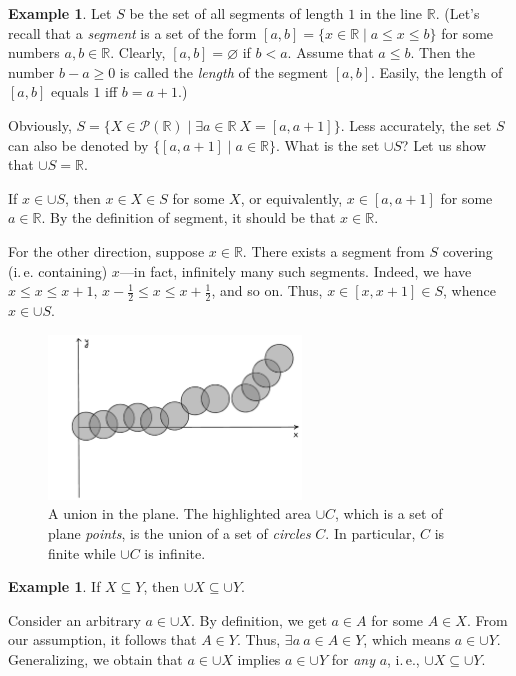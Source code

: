 \documentclass[12pt,notitlepage]{article}
\theoremstyle{plain}
\theoremstyle{definition}
\newtheorem{exm}[thm]{Example}
\theoremstyle{plain}
\newcommand{\R}{\mathbb{R}}
\newcommand{\sbs}{\subseteq}
\newcommand{\void}{\varnothing}
\newcommand{\mP}{\mathcal{P}}
\newcommand{\1}{\mathbf{1}}
\newcommand{\0}{\mathbf{0}}
\begin{document}
\begin{exm}
Let $S$ be the set of all segments of length $1$ in the line $\R$. (Let's recall that a \emph{segment} is a set of the form $[a,b] = \{ x \in \R \mid a \leq x \leq b \}$ for some numbers $a, b \in \R$. Clearly, $[a,b] = \void$ if $b < a$. Assume that $a \leq b$. Then the number $b - a \geq 0$ is called the \emph{length} of the segment $[a,b]$. Easily, the length of $[a,b]$ equals $1$ iff $b = a + 1$.)

Obviously, $S = \{ X \in \mP(\R) \mid \exists a \in \R\ X = [a, a + 1] \}$. Less accurately, the set $S$ can also be denoted by $\{ [a,a + 1] \mid a \in \R \}$. What is the set $\cup S$? Let us show that $\cup S = \R$.

If $x \in \cup S$, then $x \in X \in S$ for some $X$, or equivalently, $x \in [a, a + 1]$ for some $a \in \R$. By the definition of segment, it should be that $x \in \R$.

For the other direction, suppose $x \in \R$. There exists a segment from $S$ covering (i.\,e. containing) $x$---in fact, infinitely many such segments. Indeed, we have $x \leq x \leq x + 1$,  $x - \frac{1}{2} \leq x \leq x + \frac{1}{2}$, and so on. Thus, $x \in [x, x + 1] \in S$, whence $x \in \cup S$.
\end{exm}

\begin{figure}[h]
\centering
\includegraphics*[width=0.6\textwidth]{union.pdf}
\caption{A union in the plane. The highlighted area $\cup C$, which is a set of plane \emph{points}, is the union of a set of \emph{circles} $C$. In particular, $C$ is finite while $\cup C$ is infinite.}
\end{figure}


\begin{exm}
If $X \sbs Y$, then $\cup X \sbs \cup Y$.

Consider an arbitrary $a \in \cup X$. By definition, we get $a \in A$ for some $A \in X$. From our assumption, it follows that $A \in Y$. Thus, $\exists a\ a \in A \in Y$, which means $a \in \cup Y$. Generalizing, we obtain that $a \in \cup X$ implies $a \in \cup Y$ for \emph{any} $a$, i.\,e., $\cup X \sbs \cup Y$.
\end{exm}
\end{document}
